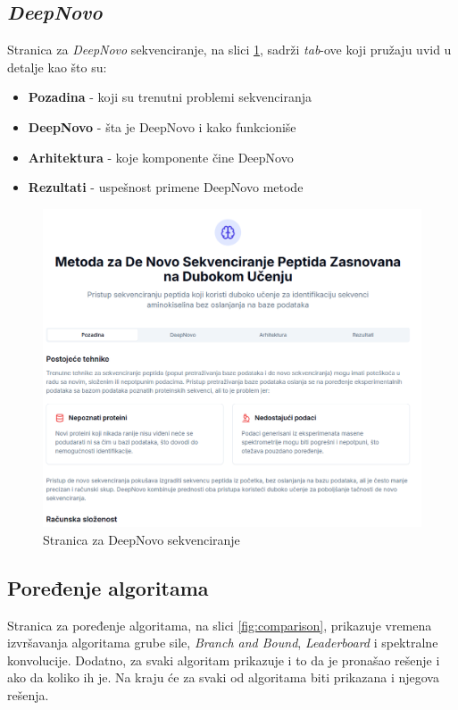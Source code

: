 \documentclass[12pt,oneside]{memoir}
\begin{document}
\subsection{\emph{DeepNovo}}
Stranica za \emph{DeepNovo} sekvenciranje, na slici \ref{fig:deepnovo_1}, sadrži \emph{tab}-ove koji pružaju uvid u detalje kao što su:
\begin{itemize}
    \item \textbf{Pozadina} - koji su trenutni problemi sekvenciranja
    \item \textbf{DeepNovo} - šta je DeepNovo i kako funkcioniše
    \item \textbf{Arhitektura} - koje komponente čine DeepNovo
    \item \textbf{Rezultati} - uspešnost primene DeepNovo metode
\end{itemize}

\begin{figure}[H]
\centering
\includegraphics[width=1\textwidth]{images/deepnovo_1.png}
\caption{Stranica za DeepNovo sekvenciranje}
\label{fig:deepnovo_1}
\end{figure}

\subsection{Poređenje algoritama}

Stranica za poređenje algoritama, na slici \ref{fig:comparison}, prikazuje vremena izvršavanja algoritama grube sile, \emph{Branch and Bound}, \emph{Leaderboard} i spektralne konvolucije. Dodatno, za svaki algoritam prikazuje i to da je pronašao rešenje i ako da koliko ih je. Na kraju će za svaki od algoritama biti prikazana i njegova rešenja. 
\end{document}
